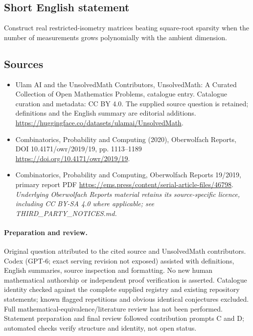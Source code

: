 \documentclass[11pt]{article}
\begin{document}
\subsection{Short English statement}
Construct real restricted-isometry matrices beating square-root sparsity when the number of measurements grows polynomially with the ambient dimension.
\subsection{Sources}
\begin{itemize}
\item[\hypertarget{source:statement:1}{S1}] Ulam AI and the UnsolvedMath Contributors, UnsolvedMath: A Curated Collection of Open Mathematics Problems, catalogue entry. Catalogue curation and metadata: CC BY 4.0. The supplied source question is retained; definitions and the English summary are editorial additions.
\url{https://huggingface.co/datasets/ulamai/UnsolvedMath}.
\item[\hypertarget{source:statement:2}{S2}] Combinatorics, Probability and Computing (2020), Oberwolfach Reports, DOI 10.4171/owr/2019/19, pp. 1113--1189
\url{https://doi.org/10.4171/owr/2019/19}.
\item[\hypertarget{source:statement:3}{S3}] Combinatorics, Probability and Computing, Oberwolfach Reports 19/2019, primary report PDF
\url{https://ems.press/content/serial-article-files/46798}.
\textit{Underlying Oberwolfach Reports material retains its source-specific licence, including CC BY-SA 4.0 where applicable; see THIRD\_PARTY\_NOTICES.md.}
\end{itemize}
\paragraph{Preparation and review.}
Original question attributed to the cited source and UnsolvedMath contributors. Codex (GPT-6; exact serving revision not exposed) assisted with definitions, English summaries, source inspection and formatting. No new human mathematical authorship or independent proof verification is asserted. Catalogue identity checked against the complete supplied registry and existing repository statements; known flagged repetitions and obvious identical conjectures excluded. Full mathematical-equivalence/literature review has not been performed. Statement preparation and final review followed contribution prompts C and D; automated checks verify structure and identity, not open status.
\label{end:statement}
\end{document}
